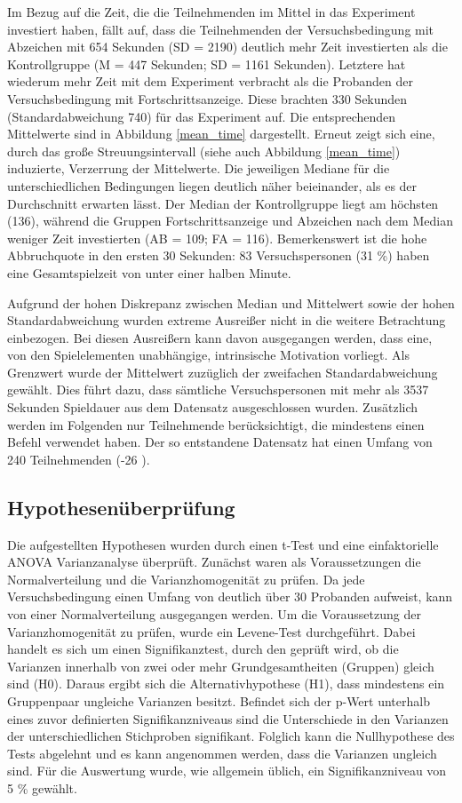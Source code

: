 Im Bezug auf die Zeit, die die Teilnehmenden im Mittel in das Experiment investiert haben, fällt auf, dass die Teilnehmenden der Versuchsbedingung mit Abzeichen mit 654 Sekunden (SD = 2190) deutlich mehr Zeit investierten als die Kontrollgruppe (M = 447 Sekunden; SD = 1161 Sekunden). Letztere hat wiederum mehr Zeit mit dem Experiment verbracht als die Probanden der Versuchsbedingung mit Fortschrittsanzeige. Diese brachten 330 Sekunden (Standardabweichung 740) für das Experiment auf. Die entsprechenden Mittelwerte sind in Abbildung \ref{mean_time} dargestellt. Erneut zeigt sich eine, durch das große Streuungsintervall (siehe auch Abbildung \ref{mean_time}) induzierte, Verzerrung der Mittelwerte. Die jeweiligen Mediane für die unterschiedlichen Bedingungen liegen deutlich näher beieinander, als es der Durchschnitt erwarten lässt. Der Median der Kontrollgruppe liegt am höchsten (136), während die Gruppen Fortschrittsanzeige und Abzeichen nach dem Median weniger Zeit investierten (AB = 109; FA = 116). Bemerkenswert ist die hohe Abbruchquote in den ersten 30 Sekunden: 83 Versuchspersonen (31 \%) haben eine Gesamtspielzeit von unter einer halben Minute.

Aufgrund der hohen Diskrepanz zwischen Median und Mittelwert sowie der hohen Standardabweichung wurden extreme Ausreißer nicht in die weitere Betrachtung einbezogen. Bei diesen Ausreißern kann davon ausgegangen werden, dass eine, von den Spielelementen unabhängige, intrinsische Motivation vorliegt. Als Grenzwert wurde der Mittelwert zuzüglich der zweifachen Standardabweichung gewählt. Dies führt dazu, dass sämtliche Versuchspersonen mit mehr als 3537 Sekunden Spieldauer aus dem Datensatz ausgeschlossen wurden. Zusätzlich werden im Folgenden nur Teilnehmende berücksichtigt, die mindestens einen Befehl verwendet haben. Der so entstandene Datensatz hat einen Umfang von 240 Teilnehmenden (-26 ).

\subsection{Hypothesenüberprüfung}\label{hypo}
Die aufgestellten Hypothesen wurden durch einen t-Test und eine einfaktorielle  ANOVA  Varianzanalyse überprüft. Zunächst waren als Voraussetzungen die Normalverteilung und die Varianzhomogenität zu prüfen. Da jede Versuchsbedingung einen Umfang von deutlich über 30 Probanden aufweist, kann von einer Normalverteilung ausgegangen werden. Um die Voraussetzung der Varianzhomogenität zu prüfen, wurde ein Levene-Test durchgeführt. Dabei handelt es sich um einen Signifikanztest, durch den geprüft wird, ob die Varianzen innerhalb von zwei oder mehr Grundgesamtheiten (Gruppen) gleich sind (H0). Daraus ergibt sich die Alternativhypothese (H1), dass mindestens ein Gruppenpaar ungleiche Varianzen besitzt. Befindet sich der p-Wert unterhalb  eines zuvor definierten Signifikanzniveaus sind die Unterschiede in den Varianzen der unterschiedlichen Stichproben signifikant. Folglich kann die Nullhypothese des Tests abgelehnt und es kann angenommen werden, dass die Varianzen ungleich sind. Für die Auswertung wurde, wie allgemein üblich, ein Signifikanzniveau von 5 \% gewählt.


